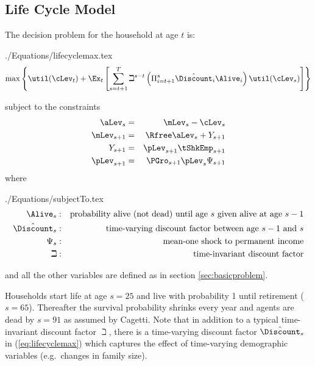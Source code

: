 \documentclass[titlepage]{\econtex}
\begin{document}
\hypertarget{LifeCycleModel}{}
\subsection{Life Cycle Model}

The decision problem for the household at age $t$ is:
\begin{verbatimwrite}{./Equations/lifecyclemax.tex}
\begin{equation}
\max \left\{ \util(\cLev_{t})+\Ex_{t}\left[\sum_{s=t+1}^{T} {\beth}^{s-t}\left( \Pi _{i=t+1}^{s}\hat{\Discount}_{i} \Alive _{i}\right) \util(\cLev_{s}) \right]\right\}   \label{eq:lifecyclemax}
\end{equation}
\end{verbatimwrite}

subject to the constraints
\begin{eqnarray*}
        \aLev_{s} &=&\mLev_{s}-\cLev_{s}
\\      \mLev_{s+1} &=&\Rfree \aLev_{s}+Y_{s+1}
\\      Y_{s+1} &=&\pLev_{s+1}\tShkEmp _{s+1}
\\      \pLev_{s+1} &=&\PGro_{s+1}\pLev_{s}\Psi_{s+1}
\end{eqnarray*}
where
\begin{verbatimwrite}{./Equations/subjectTo.tex}
\begin{eqnarray*}
        \Alive _{s} &:&\text{probability alive (not dead) until age $s$ given alive at age $s-1$}
\\      {\hat{\Discount}}_{s} &:&\text{time-varying discount factor between age $s-1$ and $s$}
\\     \Psi_{s} &:&\text{mean-one shock to permanent income}
\\     \beth &:&\text{time-invariant discount factor}
\end{eqnarray*}
\end{verbatimwrite}

and all the other variables are defined as in section \ref{sec:basicproblem}.

Households start life at age $s=25$ and live with probability 1 until retirement
($s=65$). Thereafter the survival probability shrinks every year and
agents are dead by $s=91$ as assumed by Cagetti. Note that in addition to a typical
time-invariant discount factor $\beth$, there is a time-varying
discount factor $\hat{\Discount}_{s}$ in (\ref{eq:lifecyclemax}) which
captures the effect of time-varying demographic variables (e.g.\ changes in family size).
\end{document}
